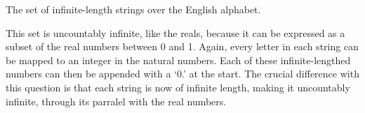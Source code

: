 \documentclass[11pt]{article}
\begin{document}
\begin{Parts}
\Part The set of infinite-length strings over the English alphabet.

\begin{solution}
    This set is uncountably infinite, like the reals, because it can be expressed
    as a subset of the real numbers between 0 and 1. Again, every letter in each
    string can be mapped to an integer in the natural numbers. Each of these
    infinite-lengthed numbers can then be appended with a `0.' at the start. The
    crucial difference with this question is that each string is now of infinite 
    length, making it uncountably infinite, through its parralel with the real 
    numbers. 
\end{solution}

\end{Parts}
\end{document}
